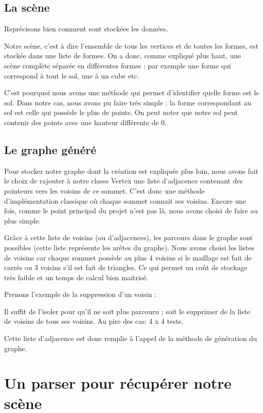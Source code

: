 \documentclass[a4paper,12pt]{report}
\begin{document}
\subsection{La scène}

Reprécisons bien comment sont stockées les données.

Notre scène, c'est à dire l'ensemble de tous les vertices et de toutes les formes, est stockée dans une liste de formes. On a donc, comme expliqué plus haut, une scène complète séparée en différentes formes : par exemple une forme qui correspond à tout le sol, une à un cube etc.

C'est pourquoi nous avons une méthode qui permet d'identifier quelle forme est le sol. Dans notre cas, nous avons pu faire très simple : la forme correspondant au sol est celle qui possède le plus de points. On peut noter que notre sol peut contenir des points avec une hauteur différente de 0.

\subsection{Le graphe généré}

Pour stocker notre graphe dont la création est expliquée plus loin, nous avons fait le choix de rajouter à notre classe Vertex une liste d'adjacence contenant des pointeurs vers les voisins de ce sommet. C'est donc une méthode d'implémentation classique où chaque sommet connait ses voisins. Encore une fois, comme le point principal du projet n'est pas là, nous avons choisi de faire au plus simple. 

Grâce à cette liste de voisins (ou d'adjacences), les parcours dans le graphe sont possibles (cette liste représente les arêtes du graphe). Nous avons choisi les listes de voisins car chaque sommet possède au plus 4 voisins si le maillage est fait de carrés ou 3 voisins s'il est fait de triangles. Ce qui permet un coût de stockage très faible et un temps de calcul bien maitrisé. 

Prenons l'exemple de la suppression d'un voisin :

Il suffit de l'isoler pour qu'il ne soit plus parcouru ; soit le supprimer de la liste de voisins de tous ses voisins. Au pire des cas: 4 x 4 tests.
 
Cette liste d'adjacence est donc remplie à l'appel de la méthode de génération du graphe.

\section{Un parser pour récupérer notre scène}
\end{document}
